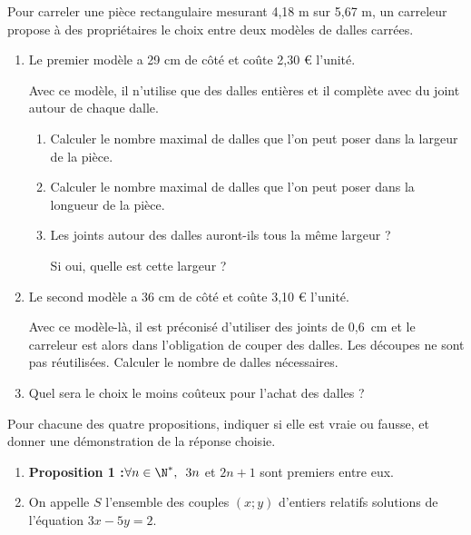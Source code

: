 \begin{colonne*exercice}

\begin{exercice}

Pour carreler une pièce rectangulaire mesurant 4,18 m sur 5,67 m, un carreleur propose à des propriétaires le choix entre deux modèles de dalles carrées.
\begin{enumerate}
\item Le premier modèle a 29 cm de côté et coûte 2,30 \euro{} l'unité.

Avec ce modèle, il n'utilise que des dalles entières et il complète avec du joint autour de chaque dalle.
\begin{enumerate}
\item Calculer le nombre maximal de dalles que l'on peut poser dans la largeur de la pièce.
\item Calculer le nombre maximal de dalles que l'on peut poser dans la longueur de la pièce.
\item Les joints autour des dalles auront-ils tous la même largeur ?

Si oui, quelle est cette largeur ?
\end{enumerate}
\item Le second modèle a 36 cm de côté et coûte 3,10 \euro{} l'unité.

  Avec ce modèle-là, il est préconisé d'utiliser des joints de 0,6~cm
  et le carreleur est alors dans l'obligation de couper des
  dalles. Les découpes ne sont pas réutilisées.  Calculer le nombre de
  dalles nécessaires.

\item Quel sera le choix le moins coûteux pour l'achat des dalles ?
\end{enumerate}
\end{exercice}


\begin{exercice}

Pour chacune des quatre propositions, indiquer si elle est vraie ou fausse, et donner une démonstration de la réponse choisie.
\begin{enumerate}
\item \textbf{Proposition 1 :}\enskip $\forall n\in\N^*,\enskip 3n$ et $2n+1$ sont premiers entre eux.
\item On appelle $S$ l'ensemble des couples $(x ; y)$ d'entiers relatifs solutions de l'équation $3x -5y = 2$.


\end{enumerate}
\end{exercice}
\end{colonne*exercice}
